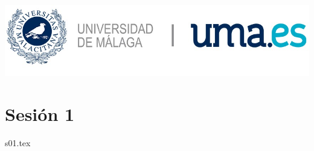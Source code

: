 \documentclass[12pt, a4paper]{article}
\begin{document}
\begin{titlepage}
\vspace*{\fill}

\vspace*{\fill}

\includegraphics[scale=0.25]{Logo_UMA.jpg}

\vspace*{\fill}
\end{titlepage}


\section{Sesión 1}

%
{s01.tex}
\end{document}
